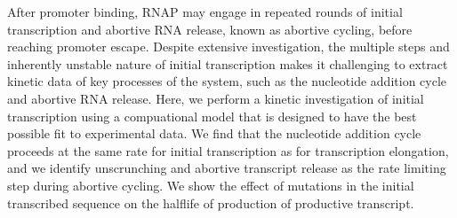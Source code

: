 After promoter binding, RNAP may engage in repeated rounds of initial
transcription and abortive RNA release, known as abortive cycling, before
reaching promoter escape. Despite extensive investigation, the multiple steps
and inherently unstable nature of initial transcription makes it challenging
to extract kinetic data of key processes of the system, such as the nucleotide
addition cycle and abortive RNA release. Here, we perform a kinetic
investigation of initial transcription using a compuational model that is
designed to have the best possible fit to experimental data. We find that the
nucleotide addition cycle proceeds at the same rate for initial transcription
as for transcription elongation, and we identify unscrunching and abortive
transcript release as the rate limiting step during abortive cycling. We show
the effect of mutations in the initial transcribed sequence on the halflife of
production of productive transcript.
